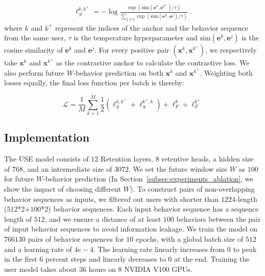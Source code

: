 \documentclass{article}
\begin{document}
\begin{equation}
\begin{split}
\ell^{k,k^+}_S =  
-\log \frac{\exp (\mathrm{sim}(\bm{e}^k, \bm{e}^{k^+}) / \tau)}
{\sum_{j \neq k} \exp(\mathrm{sim}(\bm{e}^k, \bm{e}^j) / \tau)} \;. 
\end{split}
\label{contrastive_loss}
\end{equation}
where $k$ and $k^+$ represent the indices of the anchor and the behavior sequence from the same user, $\tau$ is the temperature hyperparameter and $\mathrm{sim}(\bm{e}^k, \bm{e}^j)$ is the cosine similarity of $\bm{e}^k$ and $\bm{e}^j$. 
For every positive pair $(\bm{x}^k, \bm{x}^{k^+})$, we respectively take $\bm{x}^k$ and $\bm{x}^{k^+}$ as the contrastive anchor to calculate the contrastive loss. We also perform future $W$-behavior prediction on both $\bm{x}^k$ and $\bm{x}^{k^+}$.
Weighting both losses equally, the final loss function per batch is thereby:

\begin{equation}
    \mathcal{L} = \frac{1}{M} \sum_{k=1}^M \frac{1}{2} (\ell^{k,k^+}_S + \ell^{k^+,k}_S) + \ell_F^k + \ell_F^{k^+}
\end{equation}



\subsection{Implementation}

The USE model consists of $12$ Retention layers, $8$ retentive heads, a hidden size of $768$, and an intermediate size of $3072$. We set the future window size $W$ as $100$ for future $W$-behavior prediction (In Section~\ref{subsec:experiments_ablation}, we show the impact of choosing different $W$). To construct pairs of non-overlapping behavior sequences as inputs, we filtered out users with shorter than $1224$-length ($512$*2+$100$*2) behavior sequences. Each input behavior sequence has a sequence length of $512$, and we ensure a distance of at least $100$ behaviors between the pair of input behavior sequences to avoid information leakage. We train the model on $766130$ pairs of behavior sequences for $10$ epochs, with a global batch size of $512$ and a learning rate of $4e-4$. The learning rate linearly increases from $0$ to peak in the first $6$ percent steps and linearly decreases to 0 at the end. Training the user model takes about $36$ hours on $8$ NVIDIA V100 GPUs.
\end{document}
